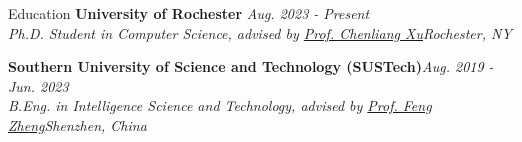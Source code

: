 \begin{rSection}{Education}
    \textbf{University of Rochester} \hfill \textit{Aug. 2023 - Present}\\
    \textit{Ph.D. Student in Computer Science, advised by \href{https://www.cs.rochester.edu/~cxu22/index.html}{Prof. Chenliang Xu}\hfill Rochester, NY}

    \textbf{Southern University of Science and Technology (SUSTech)}\hfill \textit{Aug. 2019 - Jun. 2023}\\
    \textit{B.Eng. in Intelligence Science and Technology, advised by \href{https://scholar.google.com/citations?user=PcmyXHMAAAAJ}{Prof. Feng Zheng}\hfill Shenzhen, China}
\end{rSection}
